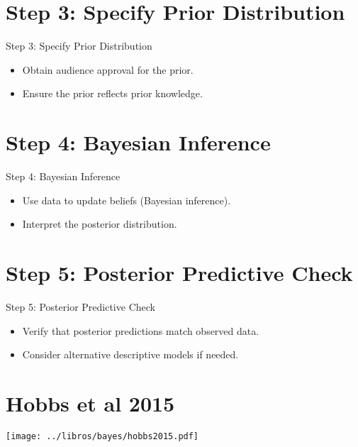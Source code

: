 \documentclass{beamer}
\begin{document}
\section{Step 3: Specify Prior Distribution}

\begin{frame}{Step 3: Specify Prior Distribution}
  \begin{itemize}
    \item Obtain audience approval for the prior.
    \item Ensure the prior reflects prior knowledge.
  \end{itemize}
\end{frame}

\section{Step 4: Bayesian Inference}

\begin{frame}{Step 4: Bayesian Inference}
  \begin{itemize}
    \item Use data to update beliefs (Bayesian inference).
    \item Interpret the posterior distribution.
  \end{itemize}
\end{frame}

\section{Step 5: Posterior Predictive Check}

\begin{frame}{Step 5: Posterior Predictive Check}
  \begin{itemize}
    \item Verify that posterior predictions match observed data.
    \item Consider alternative descriptive models if needed.
  \end{itemize}
\end{frame}

\section{Hobbs et al 2015}

\begin{frame}
  
  \begin{center}
  \texttt{[image: ../libros/bayes/hobbs2015.pdf]}
  \end{center}
  
\end{frame}
\end{document}
